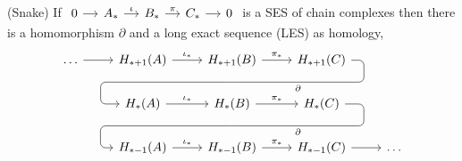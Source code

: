 \documentclass[a4paper,11pt]{article}
\begin{document}
				\begin{lemma}\label{lem--snake}
					(Snake) If $\begin{tikzcd}[column sep=small]
						0\ar[r]& A_\ast\ar[r,"\iota"]& B_\ast\ar[r,"\pi"]& C_\ast\ar[r]& 0 
					\end{tikzcd}$ is a SES of chain complexes then there is a homomorphism $\partial$ and a long exact sequence (LES) as homology,
					\begin{equation*}
						\begin{tikzcd}
							\dots \ar[r] & H_{\ast+1}(A)\ar[r,"\iota_\ast"] & H_{\ast+1}(B) \ar[r,"\pi_\ast"]\ar[d, phantom, ""{coordinate, name=Z}] & H_{\ast+1}(C) \ar[dll,
							"\partial",
							rounded corners,
							to path={ -- ([xshift=1em]\tikztostart.east) 
							|- (Z) [near end]\tikztonodes 
							-| ([xshift=-1.5em]\tikztotarget.west) 
							-- (\tikztotarget)}]\\
							& H_\ast(A)\ar[r,"\iota_\ast"] & H_\ast(B) \ar[r,"\pi_\ast"]\ar[d, phantom, ""{coordinate, name=Z}] & H_\ast(C) \ar[dll,
							"\partial",
							rounded corners,
							to path={ -- ([xshift=1.5em]\tikztostart.east) 
							|- (Z) [near end]\tikztonodes 
							-| ([xshift=-1em]\tikztotarget.west) 
							-- (\tikztotarget)}]\\
							& H_{\ast-1}(A) \ar[r,"\iota_\ast"] & H_{\ast-1}(B)\ar[r,"\pi_\ast"] & H_{\ast-1}(C)\ar[r] & \dots
						\end{tikzcd}
					\end{equation*}
				\end{lemma}
\end{document}
